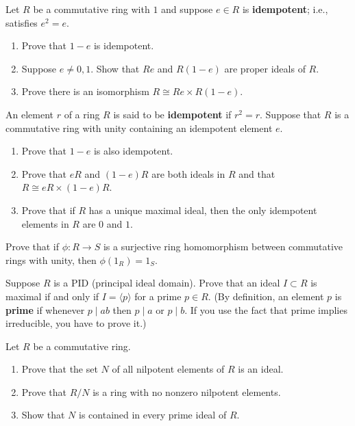 \documentclass[11pt,twoside,openany]{memoir}
\begin{document}
    \begin{exercise}
    Let $R$ be a commutative ring with $1$ and suppose $e \in R$ is \textbf{idempotent}; i.e., satisfies $e^2 = e$.
    \begin{enumerate}[label = (\arabic*)]
        \item Prove that $1-e$ is idempotent.
        \item Suppose $e \neq 0,1$. Show that $Re$ and $R(1-e)$ are proper ideals of $R$.
        \item Prove there is an isomorphism $R \cong Re \times R(1-e)$.
    \end{enumerate}
    \end{exercise}
    
    \begin{exercise}
    An element $r$ of a ring $R$ is said to be \textbf{idempotent} if $r^2 = r$. Suppose that $R$ is a commutative ring with unity containing an idempotent element $e$.
    \begin{enumerate}[label = (\arabic*)]
        \item Prove that $1-e$ is also idempotent.
        \item Prove that $eR$ and $(1-e)R$ are both ideals in $R$ and that $R\cong eR\times (1-e)R$. 
        \item Prove that if $R$ has a unique maximal ideal, then the only idempotent elements in $R$ are $0$ and $1$.
    \end{enumerate}
    \end{exercise}
    
    \begin{exercise}
    Prove that if $\phi:R\to S$ is a surjective ring homomorphism between commutative rings with unity, then $\phi(1_R)=1_S$.
    \end{exercise}
    
    \begin{exercise}
    Suppose $R$ is a PID (principal ideal domain). Prove that an ideal $I\subset R$ is maximal if and only if $I=\langle p\rangle$ for a prime $p\in R$. (By definition, an element $p$ is \textbf{prime} if whenever $p \mid ab$ then $p \mid a$ or $p \mid b$. If you use the fact that prime implies irreducible, you have to prove it.)
    \end{exercise}
    
    \begin{exercise}
    Let $R$ be a commutative ring.
    \begin{enumerate}[label = (\arabic*)]
        \item Prove that the set $N$ of all nilpotent elements of $R$ is an ideal.
        \item Prove that $R/N$ is a ring with no nonzero nilpotent elements.
        \item Show that $N$ is contained in every prime ideal of $R$.
    \end{enumerate}
    \end{exercise}
    
\end{document}
